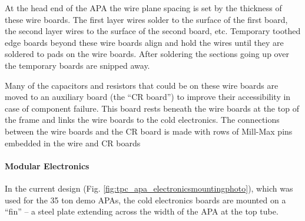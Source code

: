 At the head end of the APA the wire plane spacing is set by the thickness of these wire boards.  The first layer wires solder to the surface of the first board, the second layer wires to the surface of the second board, etc.  Temporary toothed edge boards beyond these wire boards align and hold the wires until they are soldered to pads on the wire boards.  After soldering the sections going up over the temporary boards are snipped away.

Many of the capacitors and resistors that could be on these wire boards are moved to an auxiliary board (the ``CR board'') to improve their accessibility in case of component failure.  This board rests beneath the wire boards at the top of the frame and links the wire boards to the cold electronics.  The connections between the wire boards and the CR board is made with rows of Mill-Max pins embedded in the wire and CR boards

\paragraph{Modular Electronics}
In the current design (Fig. \ref{fig:tpc_apa_electronicsmountingphoto}), which was used for the 35 ton demo APAs, the cold electronics boards are mounted on a ``fin'' -- a steel plate extending across the width of the APA at the top tube.

